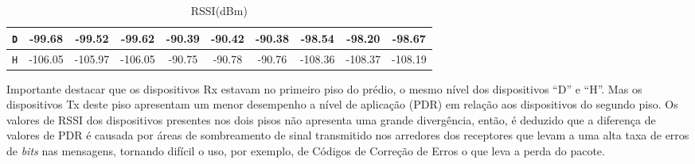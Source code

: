 \begin{table}
\begin{subtable}{\textwidth}
\begin{center}
\begin{tabular}{|c|c|c|c|c|c|c|c|c|c|}
                        \texttt{D} & -99.68                                & -99.52                                  & -99.62                                 & -90.39         & -90.42         & -90.38         & -98.54         & -98.20         & -98.67         \\ \hline
                        \texttt{H} & -106.05                               & -105.97                                 & -106.05                                & -90.75         & -90.78         & -90.76         & -108.36        & -108.37        & -108.19        \\ \hline
                  \end{tabular}
                  \caption{RSSI(dBm)}
                  \label{table:rssi1}
            \end{center}
      \end{subtable}%
      \label{tab:table1}
\end{table}

Importante destacar que os dispositivos Rx estavam no primeiro piso do prédio, o mesmo nível dos dispositivos ``D'' e ``H''. Mas os dispositivos Tx deste piso apresentam um menor desempenho a nível de aplicação (PDR) em relação aos dispositivos do segundo piso. Os valores de RSSI dos dispositivos presentes nos dois pisos não apresenta uma grande divergência, então, é deduzido que a diferença de valores de PDR é causada por áreas de sombreamento de sinal transmitido nos arredores dos receptores que levam a uma alta taxa de erros de \emph{bits} nas mensagens, tornando difícil o uso, por exemplo, de Códigos de Correção de Erros o que leva a perda do pacote.

